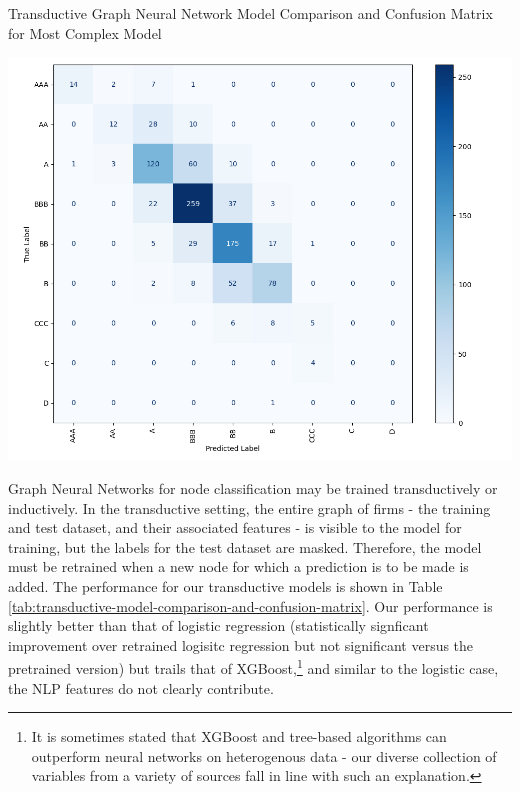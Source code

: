 \documentclass{article}[11pt]
\begin{document}
    \begin{table}[h!]
        \centering
        \caption{Transductive Graph Neural Network Model Comparison and Confusion Matrix for Most Complex Model}
        \begin{minipage}[c]{0.495\linewidth}
            \centering
            
        \end{minipage}
        \begin{minipage}[c]{0.495\linewidth}
            \centering
            \includegraphics[width=0.95\hsize]{../Output/Modelling/Graph Neural Network/Transductive/confusion_matrix_no_title.png}
        \end{minipage}
        \label{tab:transductive-model-comparison-and-confusion-matrix}
    \end{table}

    Graph Neural Networks for node classification may be trained transductively or inductively. In the transductive setting, the entire graph of firms - the training and test dataset, and their associated features - is visible to the model for training, but the labels for the test dataset are masked. Therefore, the model must be retrained when a new node for which a prediction is to be made is added. The performance for our transductive models is shown in Table \ref{tab:transductive-model-comparison-and-confusion-matrix}. Our performance is slightly better than that of logistic regression (statistically signficant improvement over retrained logisitc regression but not significant versus the pretrained version) but trails that of XGBoost,\footnote{It is sometimes stated that XGBoost and tree-based algorithms can outperform neural networks on heterogenous data - our diverse collection of variables from a variety of sources fall in line with such an explanation.} and similar to the logistic case, the NLP features do not clearly contribute.
\end{document}
